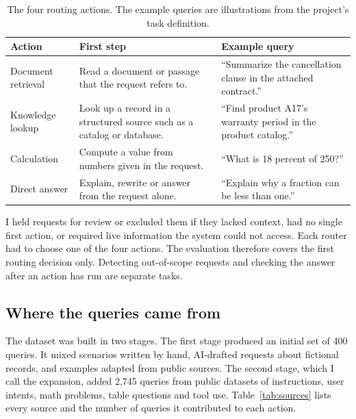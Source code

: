 \documentclass[conference]{IEEEtran}
\begin{document}
\begin{table}[tbp]
\centering\caption{The four routing actions. The example queries are illustrations from the project's task definition.}\label{tab:actions}
\begin{tabular}{@{}L{0.19\columnwidth}L{0.34\columnwidth}L{0.37\columnwidth}@{}}\toprule
Action & First step & Example query\\ \midrule
Document retrieval & Read a document or passage that the request refers to. & ``Summarize the cancellation clause in the attached contract.''\\ \addlinespace
Knowledge lookup & Look up a record in a structured source such as a catalog or database. & ``Find product A17's warranty period in the product catalog.''\\ \addlinespace
Calculation & Compute a value from numbers given in the request. & ``What is 18 percent of 250?''\\ \addlinespace
Direct answer & Explain, rewrite or answer from the request alone. & ``Explain why a fraction can be less than one.''\\ \bottomrule
\end{tabular}
\end{table}

I held requests for review or excluded them if they lacked context, had no single first action, or required live information the system could not access. Each router had to choose one of the four actions. The evaluation therefore covers the first routing decision only. Detecting out-of-scope requests and checking the answer after an action has run are separate tasks.

\subsection{Where the queries came from}
The dataset was built in two stages. The first stage produced an initial set of 400 queries. It mixed scenarios written by hand, AI-drafted requests about fictional records, and examples adapted from public sources. The second stage, which I call the expansion, added 2,745 queries from public datasets of instructions, user intents, math problems, table questions and tool use. Table~\ref{tab:sources} lists every source and the number of queries it contributed to each action.
\end{document}
